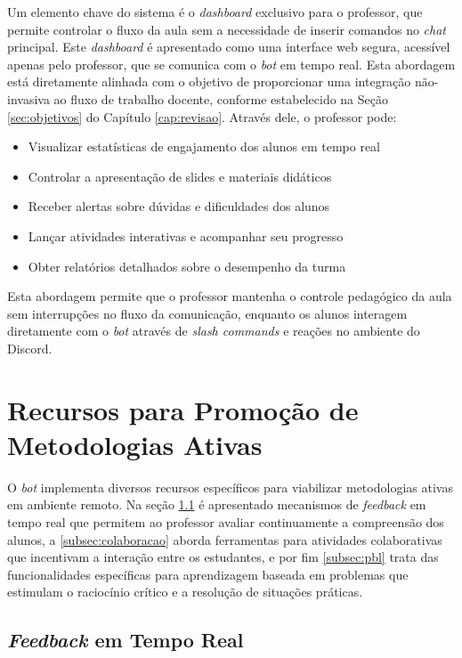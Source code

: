 Um elemento chave do sistema é o \textit{dashboard} exclusivo para o professor,
que permite controlar o fluxo da aula sem a necessidade de inserir comandos no
\textit{chat} principal. Este \textit{dashboard} é apresentado como uma
interface web segura, acessível apenas pelo professor, que se comunica com o
\textit{bot} em tempo real. Esta abordagem está diretamente alinhada com o
objetivo de proporcionar uma integração não-invasiva ao fluxo de trabalho
docente, conforme estabelecido na Seção \ref{sec:objetivos} do Capítulo
\ref{cap:revisao}. Através dele, o professor pode:

\begin{itemize}
\item Visualizar estatísticas de engajamento dos alunos em tempo real
\item Controlar a apresentação de slides e materiais didáticos
\item Receber alertas sobre dúvidas e dificuldades dos alunos
\item Lançar atividades interativas e acompanhar seu progresso
\item Obter relatórios detalhados sobre o desempenho da turma
\end{itemize}

Esta abordagem permite que o professor mantenha o controle pedagógico da aula
sem interrupções no fluxo da comunicação, enquanto os alunos interagem
diretamente com o \textit{bot} através de \textit{slash commands} e reações no
ambiente do Discord.

\section{Recursos para Promoção de Metodologias Ativas}
\label{sec:recursos}

O \textit{bot} implementa diversos recursos específicos para viabilizar
metodologias ativas em ambiente remoto. Na seção \ref{subsec:feedback} é
apresentado mecanismos de \textit{feedback} em tempo real que permitem ao
professor avaliar continuamente a compreensão dos alunos, a
\ref{subsec:colaboracao} aborda ferramentas para atividades colaborativas que
incentivam a interação entre os estudantes, e por fim \ref{subsec:pbl} trata das
funcionalidades específicas para aprendizagem baseada em problemas que estimulam
o raciocínio crítico e a resolução de situações práticas.

\subsection{\textit{Feedback} em Tempo Real}
\label{subsec:feedback}

